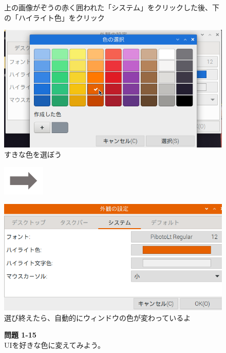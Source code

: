 \begin{figure}
\begin{minipage}{0.4\textwidth}
     上の{画像}{がぞう}の赤く囲われた「システム」をクリックした後、下の「ハイライト色」をクリック
  \end{minipage}

  \begin{minipage}{0.4\textwidth}
    \includegraphics[width=\linewidth]{text01-img/textbook-img1002.png}
     すきな色を選ぼう
  \end{minipage}
  \includegraphics[width=2cm]{text01-img/textbook-img073.png}
  \begin{minipage}{0.4\textwidth}
    \includegraphics[width=\linewidth]{text01-img/textbook-img1003.png}
     選び終えたら、自動的にウィンドウの色が変わっているよ
  \end{minipage}

  \flushleft
  \noindent \textbf{問題 1-15}\\
  UIを好きな色に変えてみよう。

\end{figure}


\bigskip

\clearpage

